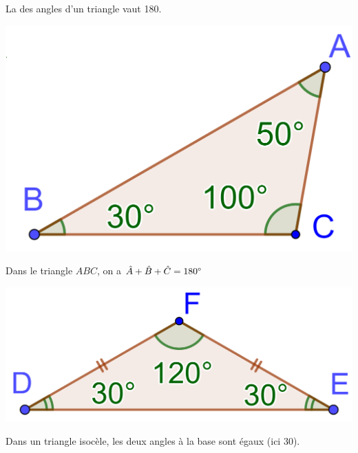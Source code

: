 \documentclass[xcolor={dvipsnames}]{beamer}
\begin{document}
\begin{frame}
	\begin{myprop}
		La  des angles d'un triangle vaut 180\degree.\pause
	\end{myprop}


	\begin{myex}
		\begin{center}
			\includegraphics[scale=0.22]{quelconque}\pause
		\end{center}
	
		Dans le triangle $ABC$, on a \pause $\hat{A} + \hat{B} + \hat{C} = 180\degree$
	\end{myex}
\end{frame}

\begin{frame}
	\begin{myex}
		\begin{center}
			\includegraphics[scale=0.22]{isocele}\pause
		\end{center}
		
		Dans un triangle isocèle, \pause les deux angles à la base sont égaux (ici 30\degree).
	\end{myex}
\end{frame}
\end{document}
